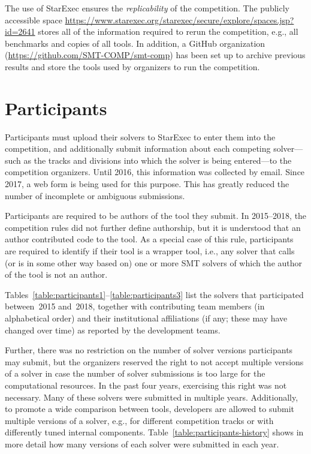 \documentclass[dvipsnames,table,twoside,11pt]{article}
\begin{document}
The use of StarExec ensures the \emph{replicability} of the competition. The publicly accessible space \url{https://www.starexec.org/starexec/secure/explore/spaces.jsp?id=2641} stores all of the information required to rerun the competition, e.g., all benchmarks and copies of all tools. In addition, a GitHub organization (\url{https://github.com/SMT-COMP/smt-comp}) has been set up to archive previous results and store the tools used by organizers to run the competition.


\section{Participants}
\label{sec:participants}

Participants must upload their solvers to StarExec to enter them into
the competition, and additionally submit information about each
competing solver---such as the tracks and divisions into which the
solver is being entered---to the competition organizers.  Until 2016,
this information was collected by email.  Since 2017, a web form is
being used for this purpose.  This has greatly reduced the number of
incomplete or ambiguous submissions.

Participants are required to be authors of the tool they submit.
In 2015--2018, the competition rules did not further define authorship,
but it is understood that an author contributed code to the tool.
As a special case of this rule, participants are required to identify
if their tool is a wrapper tool, i.e., any solver that calls (or is in some
other way based on) one or more SMT solvers of which the author of the tool
is not an author.

Tables~\ref{table:participants1}--\ref{table:participants3} list the
solvers that participated between~2015 and~2018, together with
contributing team members (in alphabetical order) and their
institutional affiliations (if any; these may have changed over time)
as reported by the development teams.

Further, there was no restriction on the number of solver versions participants
may submit, but the organizers reserved the right to not accept multiple
versions of a solver in case the number of solver submissions is too large for
the computational resources. In the past four years, exercising this right was
not necessary.
%
Many of these solvers were submitted in multiple years.  Additionally,
to promote a wide comparison between tools, developers are allowed to
submit multiple versions of a solver, e.g., for different competition
tracks or with differently tuned internal components.
Table~\ref{table:participants-history} shows in more detail how many
versions of each solver were submitted in each year.
\end{document}
